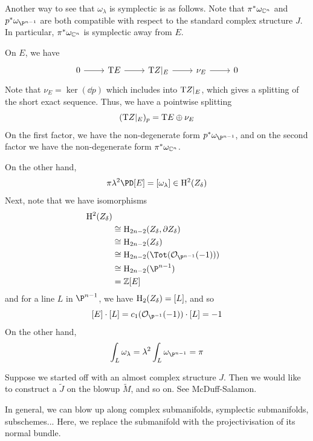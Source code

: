 \documentclass{article}
\begin{document}
\lec

Another way to see that \(\omega_\lambda\) is symplectic is as follows. Note that \(\pi^*\omega_{\mathbb{C}^n}\) and \(p^*\omega_{\P^{n-1}}\) are both compatible with respect to the standard complex structure \(J\). In particular, \(\pi^*\omega_{\mathbb{C}^n}\) is symplectic away from \(E\).

On \(E\), we have
\[\begin{tikzcd}
	0 & {\T E} & {\T Z\vert_E} & {\nu_E} & 0
	\arrow[from=1-1, to=1-2]
	\arrow[from=1-2, to=1-3]
	\arrow[from=1-3, to=1-4]
	\arrow[from=1-4, to=1-5]
\end{tikzcd}\]
Note that \(\nu_E = \ker(\dd p)\) which includes into \(\mathrm{T} Z\vert_E\), which gives a splitting of the short exact sequence. Thus, we have a pointwise splitting
\[(\mathrm{T} Z\vert_E)_p = \mathrm{T} E \oplus \nu_E\]
On the first factor, we have the non-degenerate form \(p^*\omega_{\P^{n-1}}\), and on the second factor we have the non-degenerate form \(\pi^*\omega_{\mathbb{C}^n}\).

On the other hand, 
\[\pi\lambda^2\PD[E] = [\omega_\lambda] \in \HH^2(Z_\delta)\]
Next, note that we have isomorphisms
\begin{align*}
    \HH^2(Z_\delta) \\
    &\cong \HH_{2n-2}(Z_\delta, \partial Z_\delta) \\
    &\cong \HH_{2n-2}(Z_\delta) \\
    &\cong \HH_{2n-2}(\Tot(\mcO_{\P^{n-1}}(-1))) \\
    &\cong \HH_{2n-2}(\P^{n-1}) \\
    &= \Z[E]
\end{align*}
and for a line \(L\) in \(\P^{n-1}\), we have \(\mathrm{H}_2(Z_\delta) = [L]\), and so
\[[E]\cdot [L] = c_1(\mcO_{\P^{-1}}(-1))\cdot [L] = -1\]
On the other hand,
\[\int_L\omega_\lambda = \lambda^2\int_L\omega_{\P^{n-1}} = \pi\]

\begin{remark}
    Suppose we started off with an almost complex structure \(J\). Then we would like to construct a \(\widetilde J\) on the blowup \(\widetilde M\), and so on. See McDuff-Salamon.
\end{remark}

\begin{remark}
    In general, we can blow up along complex submanifolds, symplectic submanifolds, subschemes... Here, we replace the submanifold with the projectivisation of its normal bundle.
\end{remark}
\end{document}
